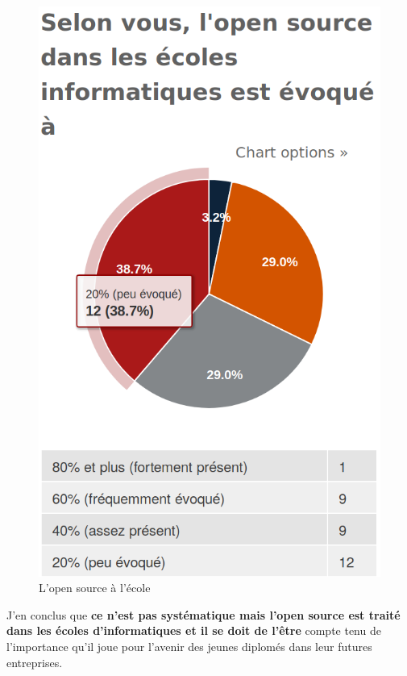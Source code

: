 			\begin{figure}[ht]
				\center
				\includegraphics[scale=0.28]{./img/a5}
				\caption{L'open source à l'école}					
			\end{figure}

			J'en conclus que \textbf{ce n'est pas systématique mais l'open source est traité dans les écoles d'informatiques et il se doit de l'être} compte tenu de l'importance qu'il joue pour l'avenir des jeunes diplomés dans leur futures entreprises.









